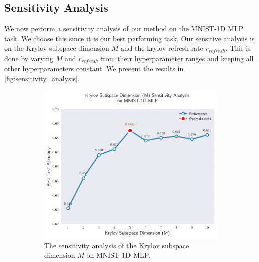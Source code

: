 \subsection{Sensitivity Analysis}
\label{ssec:sensitivity_analysis}

We now perform a sensitivity analysis of our method on the MNIST-1D MLP task. We choose this since it is our best performing task. Our sensitive analysis is on the Krylov subspace dimension $M$ and the krylov refresh rate $r_{\mathit{refresh}}$. This is done by varying $M$ and $r_{\mathit{refresh}}$ from their hyperparameter ranges and keeping all other hyperparameters constant. We present the results in \cref{fig:sensitivity_analysis}.

\begin{figure}[!t]
    \begin{subfigure}[b]{0.49\linewidth}
        \centering
        \includegraphics[width=\linewidth]{figures/5evals/sens_krylov_dim.png}
        \caption{The sensitivity analysis of the Krylov subspace dimension $M$ on MNIST-1D MLP.}
        \label{fig:sens_krylov_dim}
    \end{subfigure}
    \hfill
    \begin{subfigure}[b]{0.49\linewidth}
        \centering

\end{subfigure}
\end{figure}
